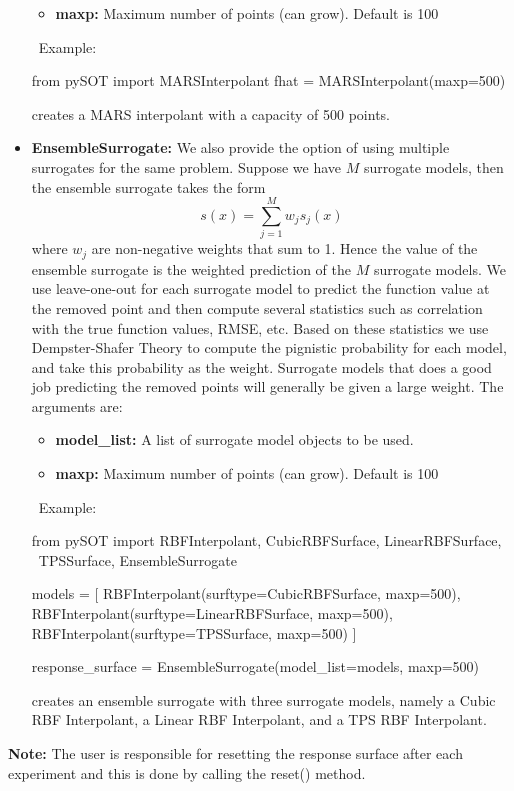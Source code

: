 \documentclass[]{article}
\begin{document}
\begin{itemize}
\begin{itemize}
\item \textbf{maxp:} Maximum number of points (can grow). Default is 100
\end{itemize}
\ \newline Example: 
\begin{python}
from pySOT import MARSInterpolant
fhat = MARSInterpolant(maxp=500)
\end{python}
creates a MARS interpolant with a capacity of 500 points.
\item \textbf{EnsembleSurrogate:} We also provide the option of using multiple surrogates for the same problem. Suppose we have $M$ surrogate models, then the ensemble surrogate takes the form
\begin{equation*}
s(x) = \sum_{j=1}^M w_j s_j(x)
\end{equation*}
where $w_j$ are non-negative weights that sum to 1. Hence the value of the ensemble surrogate is the weighted prediction of the $M$ surrogate models. We use leave-one-out for each surrogate model to predict the function value at the removed point and then compute several statistics such as correlation with the true function values, RMSE, etc.  Based on these statistics we use Dempster-Shafer Theory to compute the pignistic probability for each model, and take this probability as the weight. Surrogate models that does a good job predicting the removed points will generally be given a large weight. The arguments are:
\begin{itemize}
\item \textbf{model\_list:} A list of surrogate model objects to be used.
\item \textbf{maxp:} Maximum number of points (can grow). Default is 100
\end{itemize}
\ \newline Example: 
\begin{python}
from pySOT import RBFInterpolant, CubicRBFSurface, LinearRBFSurface, \ 
		  TPSSurface, EnsembleSurrogate

models = [
	RBFInterpolant(surftype=CubicRBFSurface, maxp=500),
	RBFInterpolant(surftype=LinearRBFSurface, maxp=500),
	RBFInterpolant(surftype=TPSSurface, maxp=500)
]

response_surface = EnsembleSurrogate(model_list=models, maxp=500)
\end{python}
creates an ensemble surrogate with three surrogate models, namely a Cubic RBF Interpolant, a Linear RBF Interpolant, and a TPS RBF Interpolant.
\end{itemize}
\textbf{Note:} The user is responsible for resetting the response surface after each experiment and this is done by calling the reset() method.
\end{document}
